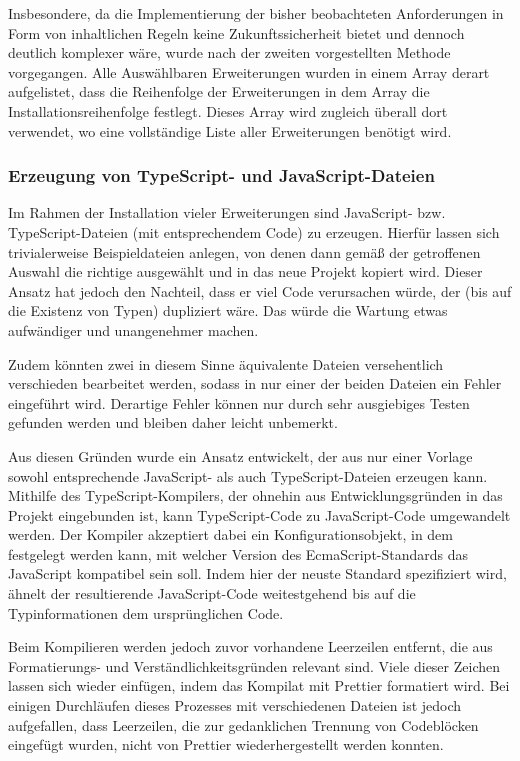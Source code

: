 Insbesondere, da die Implementierung der bisher beobachteten Anforderungen in Form von inhaltlichen Regeln keine Zukunftssicherheit bietet und dennoch deutlich komplexer wäre, wurde nach der zweiten vorgestellten Methode vorgegangen. Alle Auswählbaren Erweiterungen wurden in einem Array derart aufgelistet, dass die Reihenfolge der Erweiterungen in dem Array die Installationsreihenfolge festlegt. Dieses Array wird zugleich überall dort verwendet, wo eine vollständige Liste aller Erweiterungen benötigt wird.

\subsubsection{Erzeugung von TypeScript- und JavaScript-Dateien}
\label{impl:js_from_ts}
Im Rahmen der Installation vieler Erweiterungen sind JavaScript- bzw. TypeScript-Dateien (mit entsprechendem Code) zu erzeugen. Hierfür lassen sich trivialerweise Beispieldateien anlegen, von denen dann gemäß der getroffenen Auswahl die richtige ausgewählt und in das neue Projekt kopiert wird. Dieser Ansatz hat jedoch den Nachteil, dass er viel Code verursachen würde, der (bis auf die Existenz von Typen) dupliziert wäre. Das würde die Wartung etwas aufwändiger und unangenehmer machen.

Zudem könnten zwei in diesem Sinne äquivalente Dateien versehentlich verschieden bearbeitet werden, sodass in nur einer der beiden Dateien ein Fehler eingeführt wird. Derartige Fehler können nur durch sehr ausgiebiges Testen gefunden werden und bleiben daher leicht unbemerkt.

Aus diesen Gründen wurde ein Ansatz entwickelt, der aus nur einer Vorlage sowohl entsprechende JavaScript- als auch TypeScript-Dateien erzeugen kann. Mithilfe des TypeScript-Kompilers, der ohnehin aus Entwicklungsgründen in das Projekt eingebunden ist, kann TypeScript-Code zu JavaScript-Code umgewandelt werden. Der Kompiler akzeptiert dabei ein Konfigurationsobjekt, in dem festgelegt werden kann, mit welcher Version des EcmaScript-Standards das JavaScript kompatibel sein soll. Indem hier der neuste Standard spezifiziert wird, ähnelt der resultierende JavaScript-Code weitestgehend bis auf die Typinformationen dem ursprünglichen Code.

Beim Kompilieren werden jedoch zuvor vorhandene Leerzeilen entfernt, die aus Formatierungs- und Verständlichkeitsgründen relevant sind. Viele dieser Zeichen lassen sich wieder einfügen, indem das Kompilat mit Prettier formatiert wird. Bei einigen Durchläufen dieses Prozesses mit verschiedenen Dateien ist jedoch aufgefallen, dass Leerzeilen, die zur gedanklichen Trennung von Codeblöcken eingefügt wurden, nicht von Prettier wiederhergestellt werden konnten.

